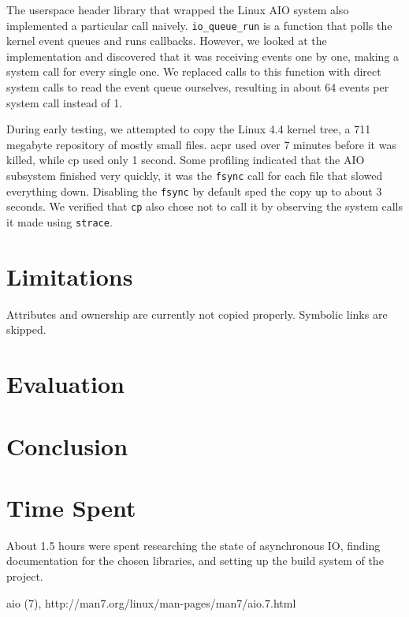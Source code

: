 \documentclass[11pt]{article}
\begin{document}
The userspace header library that wrapped the Linux AIO system also implemented
a particular call naively. \texttt{io\_queue\_run} is a function that polls the
kernel event queues and runs callbacks. However, we looked at the implementation
and discovered that it was receiving events one by one, making a system call for
every single one. We replaced calls to this function with direct system calls to
read the event queue ourselves, resulting in about 64 events per system call
instead of 1.

During early testing, we attempted to copy the Linux 4.4 kernel tree, a 711 megabyte repository of mostly small files. acpr used over 7 minutes before it was killed, while cp used only 1 second. Some profiling indicated that the AIO subsystem finished very quickly, it was the \texttt{fsync} call for each file that slowed everything down. Disabling the \texttt{fsync} by default sped the copy up to about 3 seconds. We verified that \texttt{cp} also chose not to call it by observing the system calls it made using \texttt{strace}.

\section{Limitations}

Attributes and ownership are currently not copied properly. Symbolic links are skipped.

\section{Evaluation}

\section{Conclusion}

\section{Time Spent}

About 1.5 hours were spent researching the state of asynchronous IO, finding
documentation for the chosen libraries, and setting up the build system of the
project.

\begin{thebibliography}{99}
        aio (7), http://man7.org/linux/man-pages/man7/aio.7.html
\end{thebibliography}
\end{document}
